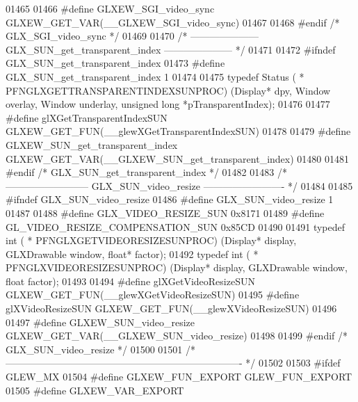 \begin{DoxyCode}
01465 
01466 \textcolor{preprocessor}{#define GLXEW\_SGI\_video\_sync GLXEW\_GET\_VAR(\_\_GLXEW\_SGI\_video\_sync)}
01467 
01468 \textcolor{preprocessor}{#endif }\textcolor{comment}{/* GLX\_SGI\_video\_sync */}\textcolor{preprocessor}{}
01469 
01470 \textcolor{comment}{/* --------------------- GLX\_SUN\_get\_transparent\_index --------------------- */}
01471 
01472 \textcolor{preprocessor}{#ifndef GLX\_SUN\_get\_transparent\_index}
01473 \textcolor{preprocessor}{#define GLX\_SUN\_get\_transparent\_index 1}
01474 
01475 \textcolor{keyword}{typedef} Status ( * PFNGLXGETTRANSPARENTINDEXSUNPROC) (Display* dpy, Window overlay, Window underlay, \textcolor{keywordtype}{
      unsigned} \textcolor{keywordtype}{long} *pTransparentIndex);
01476 
01477 \textcolor{preprocessor}{#define glXGetTransparentIndexSUN GLXEW\_GET\_FUN(\_\_glewXGetTransparentIndexSUN)}
01478 
01479 \textcolor{preprocessor}{#define GLXEW\_SUN\_get\_transparent\_index GLXEW\_GET\_VAR(\_\_GLXEW\_SUN\_get\_transparent\_index)}
01480 
01481 \textcolor{preprocessor}{#endif }\textcolor{comment}{/* GLX\_SUN\_get\_transparent\_index */}\textcolor{preprocessor}{}
01482 
01483 \textcolor{comment}{/* -------------------------- GLX\_SUN\_video\_resize ------------------------- */}
01484 
01485 \textcolor{preprocessor}{#ifndef GLX\_SUN\_video\_resize}
01486 \textcolor{preprocessor}{#define GLX\_SUN\_video\_resize 1}
01487 
01488 \textcolor{preprocessor}{#define GLX\_VIDEO\_RESIZE\_SUN 0x8171}
01489 \textcolor{preprocessor}{#define GL\_VIDEO\_RESIZE\_COMPENSATION\_SUN 0x85CD}
01490 
01491 \textcolor{keyword}{typedef} int ( * PFNGLXGETVIDEORESIZESUNPROC) (Display* display, GLXDrawable window, \textcolor{keywordtype}{float}* factor);
01492 \textcolor{keyword}{typedef} int ( * PFNGLXVIDEORESIZESUNPROC) (Display* display, GLXDrawable window, \textcolor{keywordtype}{float} factor);
01493 
01494 \textcolor{preprocessor}{#define glXGetVideoResizeSUN GLXEW\_GET\_FUN(\_\_glewXGetVideoResizeSUN)}
01495 \textcolor{preprocessor}{#define glXVideoResizeSUN GLXEW\_GET\_FUN(\_\_glewXVideoResizeSUN)}
01496 
01497 \textcolor{preprocessor}{#define GLXEW\_SUN\_video\_resize GLXEW\_GET\_VAR(\_\_GLXEW\_SUN\_video\_resize)}
01498 
01499 \textcolor{preprocessor}{#endif }\textcolor{comment}{/* GLX\_SUN\_video\_resize */}\textcolor{preprocessor}{}
01500 
01501 \textcolor{comment}{/* ------------------------------------------------------------------------- */}
01502 
01503 \textcolor{preprocessor}{#ifdef GLEW\_MX}
01504 \textcolor{preprocessor}{#define GLXEW\_FUN\_EXPORT GLEW\_FUN\_EXPORT}
01505 \textcolor{preprocessor}{#define GLXEW\_VAR\_EXPORT}

\end{DoxyCode}

